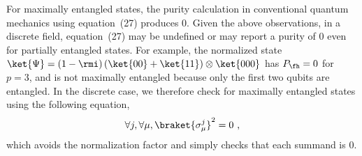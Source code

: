 For maximally entangled states, the purity calculation in conventional
quantum mechanics using equation~(27) produces 0. Given the above
observations, in a discrete field, equation~(27) may be undefined
or may report a purity of 0 even for partially entangled states. For
example, the normalized state $\ket{\Psi}=\left(1-\rmi\right)\left(\ket{00}+\ket{11}\right)\otimes\ket{000}$
has $P_{\fh}=0$ for $p=3$, and is not maximally entangled because
only the first two qubits are entangled. In the discrete case, we
therefore check for maximally entangled states using the following
equation, 
\begin{equation}
\forall j,\forall\mu,\braket{\sigma_{\mu}^{j}}^{2}=0\textrm{ ,}\label{eq:john}
\end{equation}
which avoids the normalization factor and simply checks that each
summand is 0.
